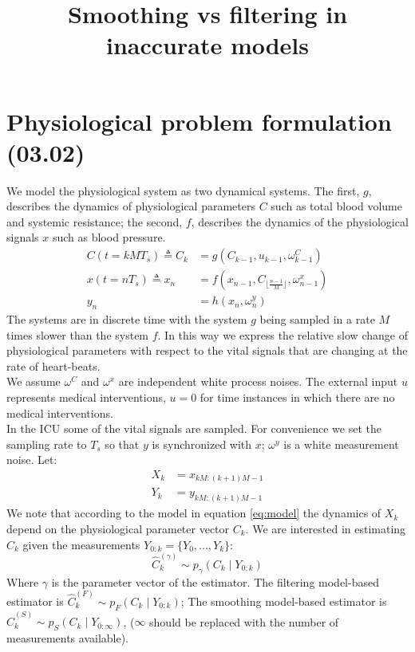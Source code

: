 \documentclass[oneside,12pt]{article}
\title{Smoothing vs filtering in inaccurate models}
\begin{document}
%
\maketitle
%
\tableofcontents
%
\section{Physiological problem formulation (03.02)}\label{sec:intro}
%
We model the physiological system as two dynamical systems. The first, $g$, describes the dynamics of physiological parameters $C$ such as total blood volume and systemic resistance; the second, $f$, describes the dynamics of the physiological signals $x$ such as blood pressure.
%
\begin{equation}\label{eq:model}
    \begin{split}
        C(t = kMT_s) \triangleq C_k &= g(C_{k-1}, u_{k-1}, \omega_{k-1}^C)\\
        x(t=nT_s) \triangleq x_n &= f(x_{n-1}, C_{\lfloor \frac{n-1}{M}\rfloor}, \omega^x_{n-1})\\
        y_n &= h(x_n, \omega^y_n)
    \end{split}
\end{equation}
%
The systems are in discrete time with the system $g$ being sampled in a rate $M$ times slower than the system $f$. In this way we express the relative slow change of physiological parameters with respect to the vital signals that are changing at the rate of heart-beats.\\
We assume $\omega^C$ and $\omega^x$ are independent white process noises. The external input $u$ represents medical interventions, $u=0$ for time instances in which there are no medical interventions.\\
In the ICU some of the vital signals are sampled. For convenience we set the sampling rate to $T_s$ so that $y$ is synchronized with $x$; $\omega^y$ is a white measurement noise. Let:
\begin{equation}
    \begin{split}
        X_k &= x_{kM:(k+1)M-1}\\
        Y_k &= y_{kM:(k+1)M-1}
    \end{split}
\end{equation}
We note that according to the model in equation \ref{eq:model} the dynamics of $X_{k}$ depend on the physiological parameter vector $C_k$. We are interested in estimating $C_k$ given the measurements $Y_{0:k} = \{Y_0, ..., Y_{k}\}$:
\begin{equation*}
    \hat{C}^{(\gamma)}_k \sim p_\gamma(C_k \mid Y_{0:k})
\end{equation*}
Where $\gamma$ is the parameter vector of the estimator. The filtering model-based estimator is $\hat{C}^{(F)}_k \sim p_F(C_k \mid Y_{0:k})$; The smoothing model-based estimator is $\hat{C}^{(S)}_k \sim p_S(C_k \mid Y_{0:\infty})$, ($\infty$ should be replaced with the number of measurements available).\\
\end{document}
